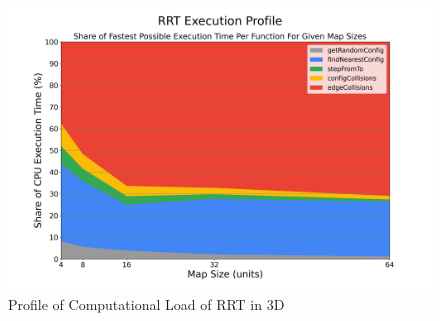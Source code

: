 \begin{figure}[H]
\begin{center}
    \includegraphics[width=\linewidth]{chapters/chapter2/img/profiling/profile3d.png}
    \caption{Profile of Computational Load of \gls{RRT} in 3D}
    \label{fig:rrt_profiling_2d}
\end{center}
\end{figure}